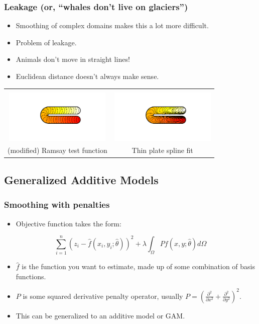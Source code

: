 \documentclass[ignorenonframetext]{beamer} %
\newcommand{\bc}{\begin{center}}
\newcommand{\ec}{\end{center}}
\newcommand{\bi}{\begin{itemize}}
\newcommand{\ei}{\end{itemize}}
\begin{document}
\begin{frame}
	\frametitle{Leakage (or, ``whales don't live on glaciers'')}
       \bi
         \item Smoothing of complex domains makes this a lot more difficult.
         \item Problem of leakage.
         \item Animals don't move in straight lines!
         \item Euclidean distance doesn't always make sense.
       \ei
       \bc\begin{tabular}{@{}cc}
          & \\
          \includegraphics[width=2in, trim=1in 1in 1in 1in]{figs/ramsayhorseshoe} & \includegraphics[width=2in, trim=1in 1in 1in 1in]{figs/leakageexample}\\
          (modified) Ramsay test function & Thin plate spline fit\\
       \end{tabular}\ec
\end{frame}

\subsection{Generalized Additive Models}

\begin{frame}
	\frametitle{Smoothing with penalties}
      \bi
         \item Objective function takes the form:
      \ei
      \bc
      \begin{equation*}
      \sum_{i=1}^n (z_i-\hat{f}(x_i,y_i;\hat{\theta}))^2 + \lambda \int_\Omega Pf(x,y;\hat{\theta})d\Omega
      \end{equation*}
      \ec
      \bi
         \item $\hat{f}$ is the function you want to estimate, made up of some combination of basis functions.
         \item $P$ is some squared derivative penalty operator, usually $P=(\frac{\partial^2}{\partial x^2}+\frac{\partial^2}{\partial y^2})^2$.
         \item This can be generalized to an additive model or GAM.
      \ei
\end{frame}
\end{document}
